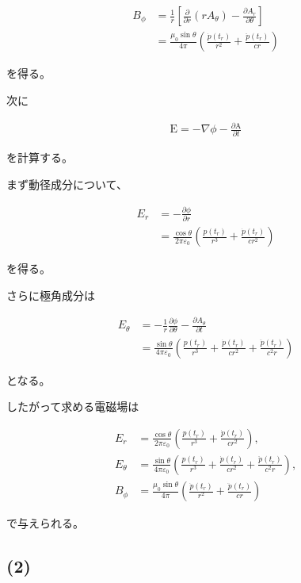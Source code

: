\documentclass[platex,dvipdfmx,a4paper]{jsarticle}
\newcommand{\hb}[2]{\frac{\partial #1}{\partial #2}}
\newcommand{\vect}[1]{\boldsymbol{\mathrm{#1}}}
\begin{document}
\begin{align*}
  B_\phi
  &=
  \frac{1}{r}
  \left[
    \hb{}{r}(rA_\theta)
    -
    \hb{A_r}{\theta}
  \right] \\
  &=
  \frac{\mu_0\sin\theta}{4\pi}
  \left(
    \frac{\dot p(t_r)}{r^2}
    +
    \frac{\ddot p(t_r)}{cr}
  \right)
\end{align*}

を得る。

次に

\begin{align*}
  \vect{E}
  =
  -\nabla\phi
  -
  \hb{\vect{A}}{t}
\end{align*}

を計算する。

まず動径成分について、

\begin{align*}
  E_r
  &=
  -\hb{\phi}{r} \\
  &=
  \frac{\cos\theta}{2\pi\varepsilon_0}
  \left(
    \frac{p(t_r)}{r^3}
    +
    \frac{\dot p(t_r)}{cr^2}
  \right)
\end{align*}

を得る。

さらに極角成分は

\begin{align*}
  E_\theta
  &=
  -\frac{1}{r}\hb{\phi}{\theta}
  -\hb{A_\theta}{t} \\
  &=
  \frac{\sin\theta}{4\pi\varepsilon_0}
  \left(
    \frac{p(t_r)}{r^3}
    +
    \frac{\dot p(t_r)}{cr^2}
    +
    \frac{\ddot p(t_r)}{c^2r}
  \right)
\end{align*}

となる。

したがって求める電磁場は

\begin{align*}
  E_r
  &=
  \frac{\cos\theta}{2\pi\varepsilon_0}
  \left(
    \frac{p(t_r)}{r^3}
    +
    \frac{\dot p(t_r)}{cr^2}
  \right),\\
  E_\theta
  &=
  \frac{\sin\theta}{4\pi\varepsilon_0}
  \left(
    \frac{p(t_r)}{r^3}
    +
    \frac{\dot p(t_r)}{cr^2}
    +
    \frac{\ddot p(t_r)}{c^2r}
  \right),\\
  B_\phi
  &=
  \frac{\mu_0\sin\theta}{4\pi}
  \left(
    \frac{\dot p(t_r)}{r^2}
    +
    \frac{\ddot p(t_r)}{cr}
  \right)
\end{align*}

で与えられる。

\subsection*{(2)}
\end{document}

